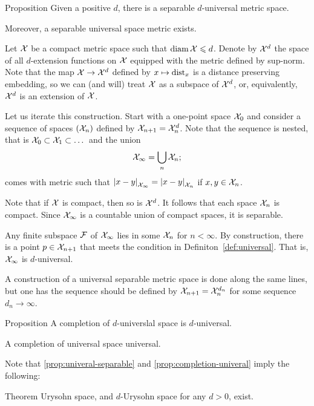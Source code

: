 \begin{thm}{Proposition}\label{prop:univeral-separable}
Given a positive $d$, there is a separable $d$-universal metric space.

Moreover, a separable universal space metric exists.
\end{thm}

Let $\mathcal{X}$ be a compact metric space such that $\operatorname{\rm diam}\nolimits\mathcal{X}\leqslant d$.
Denote by $\mathcal{X}^d$ the space of all $d$-extension functions on $\mathcal{X}$ equipped with the metric defined by sup-norm.
Note that the map $\mathcal{X} \to \mathcal{X}^d$ defined by $x\mapsto\mathrm{dist}_x$ is a distance preserving embedding,
so we can (and will) treat $\mathcal{X}$ as a subspace of $\mathcal{X}^d$, or, equivalently, $\mathcal{X}^d$ is an extension of $\mathcal{X}$.

Let us iterate this construction.
Start with a one-point space $\mathcal{X}_0$ and consider a sequence of spaces $(\mathcal{X}_n)$ defined by $\spc{X}_{n+1}\z=\spc{X}_n^d$.
Note that the sequence is nested, that is $\mathcal{X}_0\subset \mathcal{X}_1\subset\dots$
and the union
\[\mathcal{X}_\infty=\bigcup_n\mathcal{X}_n;\]
comes with metric such that
$\dist{x}{y}{\spc{X}_\infty} = \dist{x}{y}{\spc{X}_n}$
if $x,y\in\mathcal{X}_n$.

Note that if $\mathcal{X}$ is compact, then so is $\mathcal{X}^d$.
It follows that each space $\mathcal{X}_n$ is compact.
Since $\mathcal{X}_\infty$ is a countable union of compact spaces, it is separable.

Any finite subspace $\mathcal{F}$ of $\mathcal{X}_\infty$ lies in some $\mathcal{X}_n$ for $n<\infty$.
By construction, there is a point $p\in \mathcal{X}_{n+1}$ that meets the condition in Definiton~\ref{def:universal}.
That is, $\mathcal{X}_\infty$ is $d$-universal.

A construction of a universal separable metric space is done along the same lines, but one has the sequence should be defined by $\spc{X}_{n+1}\z=\spc{X}_n^{d_n}$ for some sequence $d_n\to\infty$.
\qeds

\begin{thm}{Proposition}\label{prop:completion-univeral}
A completion of $d$-universlal space is $d$-universal.

A completion of universal space universal.
\end{thm}

Note that \ref{prop:univeral-separable} and \ref{prop:completion-univeral} imply the following:

\begin{thm}{Theorem}\label{thm:urysohn-exists}
Urysohn space, and $d$-Urysohn space for any $d>0$, exist.
\end{thm}


